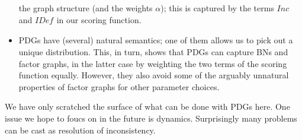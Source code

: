 \documentclass[letterpaper]{article} %
\theoremstyle{plain}
\theoremstyle{definition}
\theoremstyle{remark}
\newcommand{\IDef}[1]{\mathit{IDef}_{\!#1}}
\newcommand\Inc{\mathit{Inc}}
\begin{document}
\begin{itemize}
	the graph structure (and the weights $\alpha$); this is captured by the
	terms $\Inc$ and $\IDef{}$ in our scoring function.
\item PDGs have (several) natural semantics; one of them allows us to pick out a unique distribution. This, in turn, shows that PDGs can capture BNs and factor graphs, in the latter case by
weighting the two terms of the scoring function equally. 
However, they also avoid some of the arguably 
unnatural properties
of factor graphs
for other parameter choices.
\end{itemize}

We have only scratched the surface of what can be done with PDGs here.
One issue we hope to foucs on in the future is dynamics. 
Surprisingly many problems can be cast as resolution of inconsistency.
\end{document}
